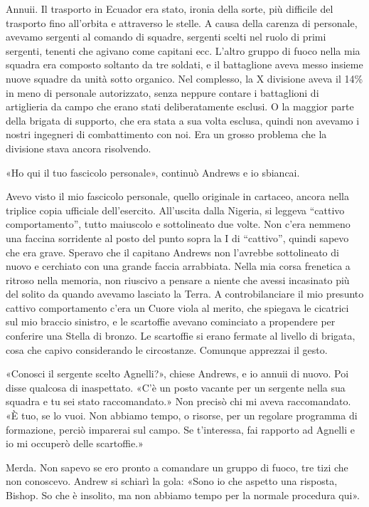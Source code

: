Annuii. Il trasporto in Ecuador era stato, ironia della sorte, più
difficile del trasporto fino all'orbita e attraverso le stelle. A causa
della carenza di personale, avevamo sergenti al comando di squadre,
sergenti scelti nel ruolo di primi sergenti, tenenti che agivano come
capitani ecc. L'altro gruppo di fuoco nella mia squadra era composto
soltanto da tre soldati, e il battaglione aveva messo insieme nuove
squadre da unità sotto organico. Nel complesso, la X divisione aveva il
14\% in meno di personale autorizzato, senza neppure contare i
battaglioni di artiglieria da campo che erano stati deliberatamente
esclusi. O la maggior parte della brigata di supporto, che era stata a
sua volta esclusa, quindi non avevamo i nostri ingegneri di
combattimento con noi. Era un grosso problema che la divisione stava
ancora risolvendo.

«Ho qui il tuo fascicolo personale», continuò Andrews e io sbiancai.

Avevo visto il mio fascicolo personale, quello originale in cartaceo,
ancora nella triplice copia ufficiale dell'esercito. All'uscita dalla
Nigeria, si leggeva ``cattivo comportamento'', tutto maiuscolo e
sottolineato due volte. Non c'era nemmeno una faccina sorridente al
posto del punto sopra la I di ``cattivo'', quindi sapevo che era grave.
Speravo che il capitano Andrews non l'avrebbe sottolineato di nuovo e
cerchiato con una grande faccia arrabbiata. Nella mia corsa frenetica a
ritroso nella memoria, non riuscivo a pensare a niente che avessi
incasinato più del solito da quando avevamo lasciato la Terra. A
controbilanciare il mio presunto cattivo comportamento c'era un Cuore
viola al merito, che spiegava le cicatrici sul mio braccio sinistro, e
le scartoffie avevano cominciato a propendere per conferire una Stella
di bronzo. Le scartoffie si erano fermate al livello di brigata, cosa
che capivo considerando le circostanze. Comunque apprezzai il gesto.

«Conosci il sergente scelto Agnelli?», chiese Andrews, e io annuii di
nuovo. Poi disse qualcosa di inaspettato. «C'è un posto vacante per un
sergente nella sua squadra e tu sei stato raccomandato.» Non precisò chi
mi aveva raccomandato. «È tuo, se lo vuoi. Non abbiamo tempo, o risorse,
per un regolare programma di formazione, perciò imparerai sul campo. Se
t'interessa, fai rapporto ad Agnelli e io mi occuperò delle scartoffie.»

Merda. Non sapevo se ero pronto a comandare un gruppo di fuoco, tre tizi
che non conoscevo. Andrew si schiarì la gola: «Sono io che aspetto una
risposta, Bishop. So che è insolito, ma non abbiamo tempo per la normale
procedura qui».

